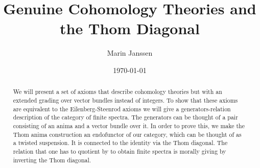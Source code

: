 \documentclass{article}
\begin{document}
\title{Genuine Cohomology Theories and the Thom Diagonal}
\author{Marin Janssen}
\date{\today}

\maketitle

\begin{abstract}
    We will present a set of axioms that describe cohomology theories but with an extended grading over vector bundles instead of integers.
    To show that these axioms are equivalent to the Eilenberg-Steenrod axioms we will give a generators-relation description of the category of finite spectra.
    The generators can be thought of a pair consisting of an anima and a vector bundle over it.
    In order to prove this, we make the Thom anima construction an endofunctor of our category, which can be thought of as a twisted suspension.
    It is connected to the identity via the Thom diagonal. The relation that one has to quotient by to obtain finite spectra is morally giving 
    by inverting the Thom diagonal.
\end{abstract}

\tableofcontents

% 



% 

% 



% 
\end{document}

